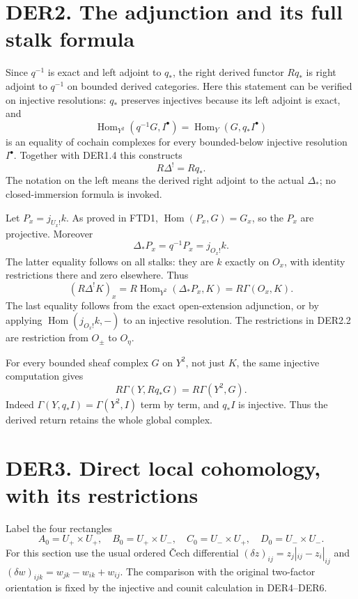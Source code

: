 \section{DER2. The adjunction and its full stalk
formula}\label{der2.-the-adjunction-and-its-full-stalk-formula}

Since \(q^{-1}\) is exact and left adjoint to \(q_*\), the right derived
functor \(Rq_*\) is right adjoint to \(q^{-1}\) on bounded derived
categories. Here this statement can be verified on injective
resolutions: \(q_*\) preserves injectives because its left adjoint is
exact, and \[
\operatorname{Hom}_{Y^2}(q^{-1}G,I^\bullet)
=\operatorname{Hom}_Y(G,q_*I^\bullet)
\] is an equality of cochain complexes for every bounded-below injective
resolution \(I^\bullet\). Together with DER1.4 this constructs \[
\boxed{R\Delta^!=Rq_*.}
\tag{DER2.1}
\] The notation on the left means the derived right adjoint to the
actual \(\Delta_*\); no closed-immersion formula is invoked.

Let \(P_x=j_{U_x!}k\). As proved in FTD1,
\(\operatorname{Hom}(P_x,G)=G_x\), so the \(P_x\) are projective.
Moreover \[
\Delta_*P_x=q^{-1}P_x=j_{O_x!}k.
\] The latter equality follows on all stalks: they are \(k\) exactly on
\(O_x\), with identity restrictions there and zero elsewhere. Thus \[
(R\Delta^!K)_x
=R\operatorname{Hom}_{Y^2}(\Delta_*P_x,K)
=R\Gamma(O_x,K).
\tag{DER2.2}
\] The last equality follows from the exact open-extension adjunction,
or by applying \(\operatorname{Hom}(j_{O_x!}k,-)\) to an injective
resolution. The restrictions in DER2.2 are restriction from \(O_\pm\) to
\(O_\eta\).

For every bounded sheaf complex \(G\) on \(Y^2\), not just \(K\), the
same injective computation gives \[
\boxed{R\Gamma(Y,Rq_*G)=R\Gamma(Y^2,G).}
\tag{DER2.3}
\] Indeed \(\Gamma(Y,q_*I)=\Gamma(Y^2,I)\) term by term, and \(q_*I\) is
injective. Thus the derived return retains the whole global complex.

\section{DER3. Direct local cohomology, with its
restrictions}\label{der3.-direct-local-cohomology-with-its-restrictions}

Label the four rectangles \[
A_0=U_+\times U_+,\quad B_0=U_+\times U_-,
\quad C_0=U_-\times U_+,\quad D_0=U_-\times U_-.
\] For this section use the usual ordered Čech differential
\((\delta z)_{ij}=z_j|_{ij}-z_i|_{ij}\) and
\((\delta w)_{ijk}=w_{jk}-w_{ik}+w_{ij}\). The comparison with the
original two-factor orientation is fixed by the injective and counit
calculation in DER4--DER6.


